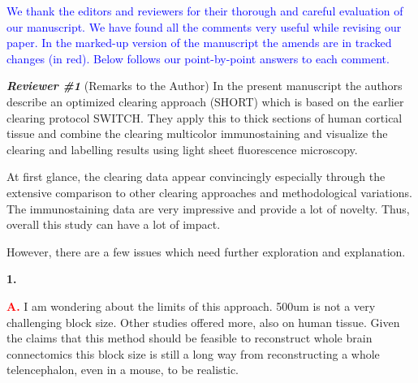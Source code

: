 \documentclass{article}
\newcommand{\reply}[1]{\textcolor{blue}{#1}}
\newcommand{\redmark}[1]{\textcolor{red}{#1}}
\begin{document}
\noindent {}\reply{We thank the editors and reviewers for their thorough and careful evaluation of our manuscript. We} \reply{have found all the comments very useful while revising our paper. In the marked-up version of the} \reply{manuscript the amends are in tracked changes (in red). Below follows our point-by-point answers} \reply{to each comment.}

\noindent \emph{\textbf{Reviewer \#1}} (Remarks to the Author) In the present manuscript the authors describe an optimized clearing approach (SHORT) which is based on the earlier clearing protocol SWITCH. They apply this to thick sections of human cortical tissue and combine the clearing multicolor immunostaining and visualize the clearing and labelling results using light sheet fluorescence microscopy.

\noindent At first glance, the clearing data appear convincingly especially through the extensive comparison to other clearing approaches and methodological variations. The immunostaining data are very impressive and provide a lot of novelty. Thus, overall this study can have a lot of impact.

\noindent However, there are a few issues which need further exploration and explanation.

\noindent \textbf{1.}

\noindent \redmark{\textbf{A.}} I am wondering about the limits of this approach. 500um is not a very challenging block size. Other studies offered more, also on human tissue. Given the claims that this method should be feasible to reconstruct whole brain connectomics this block size is still a long way from reconstructing a whole telencephalon, even in a mouse, to be realistic.
\end{document}
